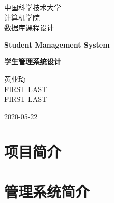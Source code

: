 \documentclass[10pt,english, openany]{book}
\begin{document}

\begin{titlepage}
	\clearpage\thispagestyle{empty}
	\centering
	\vspace{1cm}

	{\normalsize 中国科学技术大学\\
	计算机学院\\
	数据库课程设计 \par}
		\vspace{3cm}
	{\Huge \textbf{Student Management System}} \\
	\vspace{1cm}
	{\large \textbf{学生管理系统设计} \par}
	\vspace{4cm}
	{\normalsize 黄业琦\\ %
	             FIRST LAST \\
	             FIRST LAST\par}
	\vspace{5cm}
    
    \centering 
    
    \vspace{0.5cm}
		
	{\normalsize 2020-05-22 \par}
	
	\pagebreak

\end{titlepage}

\tableofcontents{}

\mainmatter

\chapter{项目简介}




\chapter{管理系统简介}

\end{document}
